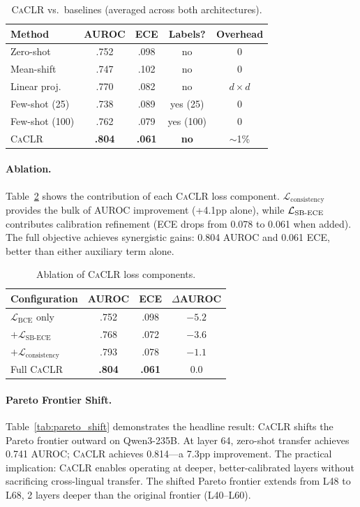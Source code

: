 \documentclass[11pt,a4paper]{article}
\newcommand{\caclr}{\textsc{CaCLR}}
\begin{document}
\begin{table}[t]
\centering
\small
\caption{\caclr{} vs.\ baselines (averaged across both architectures).}
\label{tab:caclr_full}
\begin{tabular}{lcccc}
\toprule
Method & AUROC & ECE & Labels? & Overhead \\
\midrule
Zero-shot & .752 & .098 & no & 0 \\
Mean-shift & .747 & .102 & no & 0 \\
Linear proj. & .770 & .082 & no & $d{\times}d$ \\
Few-shot (25) & .738 & .089 & yes (25) & 0 \\
Few-shot (100) & .762 & .079 & yes (100) & 0 \\
\caclr{} & \textbf{.804} & \textbf{.061} & \textbf{no} & $\sim$1\% \\
\bottomrule
\end{tabular}
\end{table}

\paragraph{Ablation.}
Table~\ref{tab:ablation} shows the contribution of each \caclr{} loss component. $\mathcal{L}_\text{consistency}$ provides the bulk of AUROC improvement (+4.1pp alone), while $\mathcal{L}_\text{SB\text{-}ECE}$ contributes calibration refinement (ECE drops from 0.078 to 0.061 when added). The full objective achieves synergistic gains: 0.804 AUROC and 0.061 ECE, better than either auxiliary term alone.

\begin{table}[t]
\centering
\small
\caption{Ablation of \caclr{} loss components.}
\label{tab:ablation}
\begin{tabular}{lccc}
\toprule
Configuration & AUROC & ECE & $\Delta$AUROC \\
\midrule
$\mathcal{L}_\text{BCE}$ only & .752 & .098 & $-5.2$ \\
$+ \mathcal{L}_\text{SB-ECE}$ & .768 & .072 & $-3.6$ \\
$+ \mathcal{L}_\text{consistency}$ & .793 & .078 & $-1.1$ \\
Full \caclr{} & \textbf{.804} & \textbf{.061} & 0.0 \\
\bottomrule
\end{tabular}
\end{table}

\paragraph{Pareto Frontier Shift.}
Table~\ref{tab:pareto_shift} demonstrates the headline result: \caclr{} shifts the Pareto frontier outward on Qwen3-235B. At layer 64, zero-shot transfer achieves 0.741 AUROC; \caclr{} achieves 0.814---a 7.3pp improvement. The practical implication: \caclr{} enables operating at deeper, better-calibrated layers without sacrificing cross-lingual transfer. The shifted Pareto frontier extends from L48 to L68, 2 layers deeper than the original frontier (L40--L60).
\end{document}
